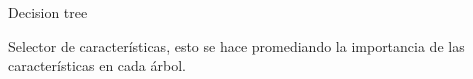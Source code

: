 Decision tree

Selector de características, esto se hace promediando la importancia de las características en cada árbol.



